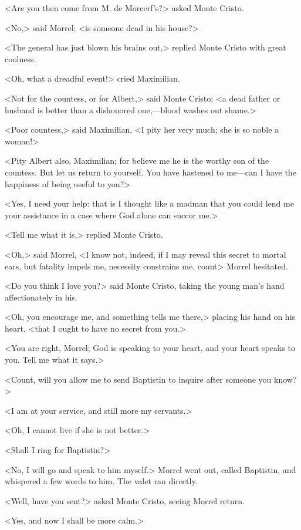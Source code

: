  <Are you then come from M. de Morcerf's?> asked Monte Cristo. 

 <No,> said Morrel; <is someone dead in his house?> 

 <The general has just blown his brains out,> replied Monte Cristo with great coolness. 

 <Oh, what a dreadful event!> cried Maximilian. 

 <Not for the countess, or for Albert,> said Monte Cristo; <a dead father or husband is better than a dishonored one,—blood washes out shame.> 

 <Poor countess,> said Maximilian, <I pity her very much; she is so noble a woman!> 

 <Pity Albert also, Maximilian; for believe me he is the worthy son of the countess. But let us return to yourself. You have hastened to me—can I have the happiness of being useful to you?>

<Yes, I need your help: that is I thought like a madman that you could lend me your assistance in a case where God alone can succor me.> 

 <Tell me what it is,> replied Monte Cristo. 

 <Oh,> said Morrel, <I know not, indeed, if I may reveal this secret to mortal ears, but fatality impels me, necessity constrains me, count\longdash> Morrel hesitated. 

 <Do you think I love you?> said Monte Cristo, taking the young man's hand affectionately in his. 

 <Oh, you encourage me, and something tells me there,> placing his hand on his heart, <that I ought to have no secret from you.> 

 <You are right, Morrel; God is speaking to your heart, and your heart speaks to you. Tell me what it says.> 

 <Count, will you allow me to send Baptistin to inquire after someone you know?> 

 <I am at your service, and still more my servants.> 

 <Oh, I cannot live if she is not better.> 

 <Shall I ring for Baptistin?> 

 <No, I will go and speak to him myself.> Morrel went out, called Baptistin, and whispered a few words to him. The valet ran directly. 

 <Well, have you sent?> asked Monte Cristo, seeing Morrel return. 

 <Yes, and now I shall be more calm.> 

